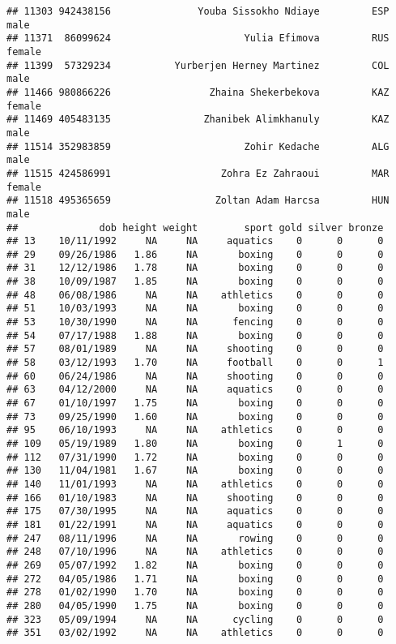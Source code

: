 \documentclass[]{article}
\begin{document}
\begin{verbatim}
## 11303 942438156               Youba Sissokho Ndiaye         ESP   male
## 11371  86099624                       Yulia Efimova         RUS female
## 11399  57329234           Yurberjen Herney Martinez         COL   male
## 11466 980866226                 Zhaina Shekerbekova         KAZ female
## 11469 405483135                Zhanibek Alimkhanuly         KAZ   male
## 11514 352983859                       Zohir Kedache         ALG   male
## 11515 424586991                   Zohra Ez Zahraoui         MAR female
## 11518 495365659                  Zoltan Adam Harcsa         HUN   male
##              dob height weight        sport gold silver bronze
## 13    10/11/1992     NA     NA     aquatics    0      0      0
## 29    09/26/1986   1.86     NA       boxing    0      0      0
## 31    12/12/1986   1.78     NA       boxing    0      0      0
## 38    10/09/1987   1.85     NA       boxing    0      0      0
## 48    06/08/1986     NA     NA    athletics    0      0      0
## 51    10/03/1993     NA     NA       boxing    0      0      0
## 53    10/30/1990     NA     NA      fencing    0      0      0
## 54    07/17/1988   1.88     NA       boxing    0      0      0
## 57    08/01/1989     NA     NA     shooting    0      0      0
## 58    03/12/1993   1.70     NA     football    0      0      1
## 60    06/24/1986     NA     NA     shooting    0      0      0
## 63    04/12/2000     NA     NA     aquatics    0      0      0
## 67    01/10/1997   1.75     NA       boxing    0      0      0
## 73    09/25/1990   1.60     NA       boxing    0      0      0
## 95    06/10/1993     NA     NA    athletics    0      0      0
## 109   05/19/1989   1.80     NA       boxing    0      1      0
## 112   07/31/1990   1.72     NA       boxing    0      0      0
## 130   11/04/1981   1.67     NA       boxing    0      0      0
## 140   11/01/1993     NA     NA    athletics    0      0      0
## 166   01/10/1983     NA     NA     shooting    0      0      0
## 175   07/30/1995     NA     NA     aquatics    0      0      0
## 181   01/22/1991     NA     NA     aquatics    0      0      0
## 247   08/11/1996     NA     NA       rowing    0      0      0
## 248   07/10/1996     NA     NA    athletics    0      0      0
## 269   05/07/1992   1.82     NA       boxing    0      0      0
## 272   04/05/1986   1.71     NA       boxing    0      0      0
## 278   01/02/1990   1.70     NA       boxing    0      0      0
## 280   04/05/1990   1.75     NA       boxing    0      0      0
## 323   05/09/1994     NA     NA      cycling    0      0      0
## 351   03/02/1992     NA     NA    athletics    0      0      0

\end{verbatim}
\end{document}

